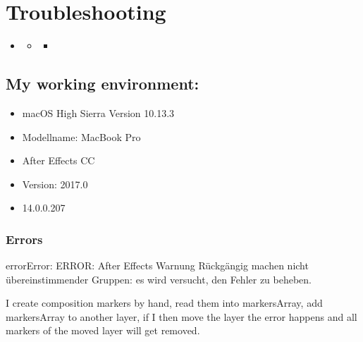 \documentclass[a4paper,11pt,openany,oneside,english]{sphinxmanual}
\begin{document}
\section{Troubleshooting}
\label{\detokenize{troubleshooting:troubleshooting}}\label{\detokenize{troubleshooting::doc}}
\begin{sphinxShadowBox}
\begin{itemize}
\item {} 
\label{\detokenize{troubleshooting:id1}}{\hyperref[\detokenize{troubleshooting:troubleshooting}]{}}
\begin{itemize}
\item {} 
\label{\detokenize{troubleshooting:id2}}{\hyperref[\detokenize{troubleshooting:my-working-environment}]{}}
\begin{itemize}
\item {} 
\label{\detokenize{troubleshooting:id3}}{\hyperref[\detokenize{troubleshooting:errors}]{}}

\end{itemize}

\end{itemize}

\end{itemize}
\end{sphinxShadowBox}


\subsection{My working environment:}
\label{\detokenize{troubleshooting:my-working-environment}}\begin{itemize}
\item {} 
macOS High Sierra Version 10.13.3

\item {} 
Modellname: MacBook Pro

\item {} 
After Effects CC

\item {} 
Version: 2017.0

\item {} 
14.0.0.207

\end{itemize}


\subsubsection{Errors}
\label{\detokenize{troubleshooting:errors}}
\begin{sphinxadmonition}{error}{Error:}
ERROR: After Effects Warnung Rückgängig machen nicht übereinstimmender Gruppen: es wird versucht, den Fehler zu beheben.

I create composition markers by hand, read them into markersArray, add markersArray to another layer, if I then move the layer the error happens and all markers of the moved layer will get removed.
\end{sphinxadmonition}
\end{document}
